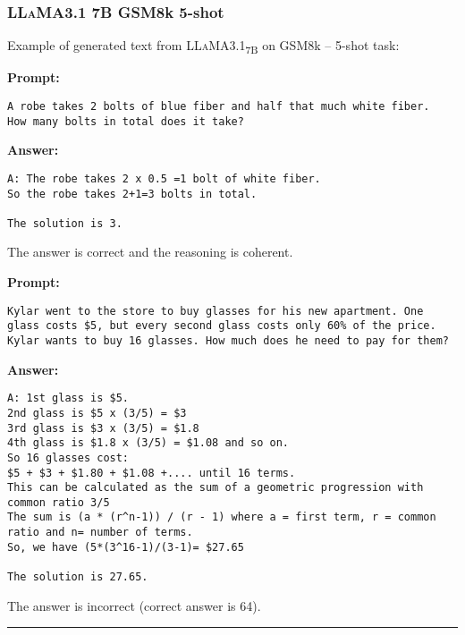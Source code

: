	\subsubsection*{\textsc{LLaMA}3.1 7B GSM8k 5-shot}
	\noindent Example of generated text from \textsc{LLaMA}3.1\textsubscript{7B} on GSM8k -- 5-shot task:
	\begin{displayquote}
		\textbf{Prompt:}
		\begin{Verbatim}[fontsize=\small,breaklines]
A robe takes 2 bolts of blue fiber and half that much white fiber.  How many bolts in total does it take?
	\end{Verbatim}
		\textbf{Answer:}
		\begin{Verbatim}[fontsize=\small,breaklines]
A: The robe takes 2 x 0.5 =1 bolt of white fiber.
So the robe takes 2+1=3 bolts in total.

The solution is 3.
	\end{Verbatim}
	\end{displayquote}
	The answer is correct and the reasoning is coherent.
	\begin{displayquote}
		\textbf{Prompt:}
		\begin{Verbatim}[fontsize=\small,breaklines]
Kylar went to the store to buy glasses for his new apartment. One glass costs $5, but every second glass costs only 60% of the price. Kylar wants to buy 16 glasses. How much does he need to pay for them?
	\end{Verbatim}
		\textbf{Answer:}
		\begin{Verbatim}[fontsize=\small,breaklines]
A: 1st glass is $5.
2nd glass is $5 x (3/5) = $3
3rd glass is $3 x (3/5) = $1.8
4th glass is $1.8 x (3/5) = $1.08 and so on.
So 16 glasses cost:
$5 + $3 + $1.80 + $1.08 +.... until 16 terms.
This can be calculated as the sum of a geometric progression with common ratio 3/5
The sum is (a * (r^n-1)) / (r - 1) where a = first term, r = common ratio and n= number of terms.
So, we have (5*(3^16-1)/(3-1)= $27.65

The solution is 27.65.
	\end{Verbatim}
	\end{displayquote}
	The answer is incorrect (correct answer is 64).

	\noindent\rule{\textwidth}{0.4pt}

